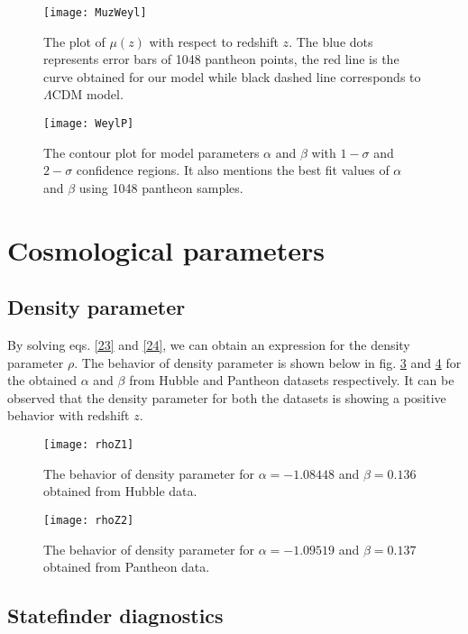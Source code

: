 \begin{figure}[H]
\centering
\texttt{[image: MuzWeyl]}
\caption{The plot of $\mu(z)$ with respect to redshift $z$. The blue dots represents error bars of 1048 pantheon points, the red line is the curve obtained for our model while black dashed line corresponds to $\Lambda$CDM model.}
\label{fig-3}
\end{figure}

\begin{figure}[H]
\centering
\texttt{[image: WeylP]}
\caption{The contour plot for model parameters $\alpha$ and $\beta$ with $1-\sigma$ and $2-\sigma$ confidence regions. It also mentions the best fit values of $\alpha$ and $\beta$ using 1048 pantheon samples.}
\label{fig-4}
\end{figure}

\section{Cosmological parameters}\label{sec4}

\subsection{Density parameter}

By solving eqs. \eqref{23} and \eqref{24}, we can obtain an expression for the density parameter $\rho$. The behavior of density parameter is shown below in fig. \ref{fig-5} and \ref{fig-6} for the obtained $\alpha$ and $\beta$ from Hubble and Pantheon datasets respectively. It can be observed that the density parameter for both the datasets is showing a positive behavior with redshift $z$.

\begin{figure}[H]
\centering
\texttt{[image: rhoZ1]}
\caption{The behavior of density parameter for $\alpha= -1.08448$ and $\beta=0.136 $ obtained from Hubble data.}
\label{fig-5}
\end{figure}

\begin{figure}[H]
\centering
\texttt{[image: rhoZ2]}
\caption{The behavior of density parameter for $\alpha=-1.09519$ and $\beta= 0.137$ obtained from Pantheon data.}
\label{fig-6}
\end{figure}

\subsection{Statefinder diagnostics}

